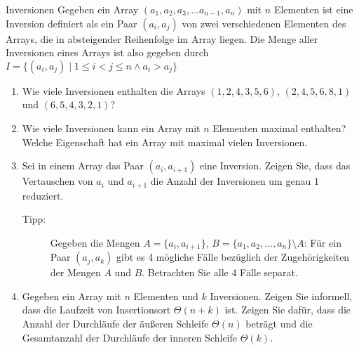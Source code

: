\documentclass[11pt,a4paper]{article}
\begin{document}
\begin{aufgabe}{4}{\hard Inversionen}
    Gegeben ein Array $(a_1, a_2, a_3, \ldots a_{n - 1}, a_n)$ mit $n$ Elementen ist eine Inversion definiert als ein Paar $(a_i, a_j)$ von zwei verschiedenen Elementen des Arrays, die in absteigender Reihenfolge im Array liegen.
    Die Menge aller Inversionen eines Arrays ist also gegeben durch $I = \{(a_i, a_j) \mid 1 \leq i < j \leq n \wedge a_i > a_j \}$
    \begin{enumerate}
        \item Wie viele Inversionen enthalten die Arrays $(1, 2, 4, 3, 5, 6)$, $(2, 4, 5, 6, 8, 1)$ und $(6, 5, 4, 3, 2, 1)$?

        \item Wie viele Inversionen kann ein Array mit $n$ Elementen maximal enthalten? Welche Eigenschaft hat ein Array mit maximal vielen Inversionen.


        \item Sei in einem Array das Paar $(a_i, a_{i + 1})$ eine Inversion. Zeigen Sie, dass das Vertauschen von $a_i$ und $a_{i + 1}$ die Anzahl der Inversionen um genau 1 reduziert.
        \begin{description}
            \item[Tipp:] Gegeben die Mengen $A = \{a_i, a_{i + 1}\}$, $B = \{a_1, a_2, \ldots, a_n\} \setminus A$:
            Für ein Paar $(a_j, a_k)$ gibt es 4 mögliche Fälle bezüglich der Zugehörigkeiten der Mengen $A$ und $B$.
            Betrachten Sie alle 4 Fälle separat.
        \end{description}
        
        \item Gegeben ein Array mit $n$ Elementen und $k$ Inversionen. Zeigen Sie informell, dass die Laufzeit von Insertionsort $\Theta(n + k)$ ist.
        Zeigen Sie dafür, dass die Anzahl der Durchläufe der äußeren Schleife $\Theta(n)$ beträgt und die Gesamtanzahl der Durchläufe der inneren Schleife $\Theta(k)$.

    \end{enumerate}
\end{aufgabe}
\end{document}
